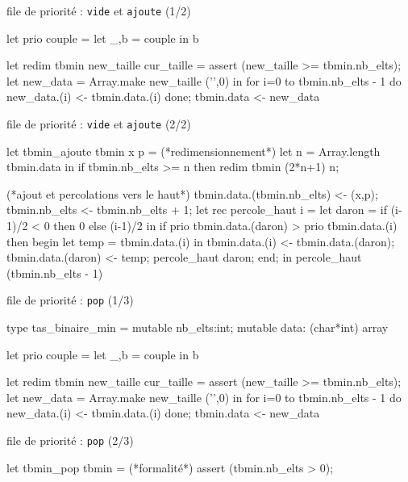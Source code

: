 \begin{adjustwidth}{-3cm}{-3cm}
\begin{implementation}{file de priorité : \texttt{vide} et \texttt{ajoute} (1/2) }
\begin{lstOCaml}
    let prio couple = 
        let _,b = couple in b

    let redim tbmin new_taille cur_taille = 
        assert (new_taille >= tbmin.nb_elts);
        let new_data = Array.make new_taille ('',0) in
        for i=0 to tbmin.nb_elts - 1 do
            new_data.(i) <- tbmin.data.(i)
        done;
        tbmin.data <- new_data
    \end{lstOCaml}
\end{implementation}

\begin{implementation}{file de priorité : \texttt{vide} et \texttt{ajoute} (2/2)}
    \begin{lstOCaml}
    let tbmin_ajoute tbmin x p  =
        (*redimensionnement*)
        let n = Array.length tbmin.data in
        if tbmin.nb_elts >= n then 
            redim tbmin (2*n+1) n;

        (*ajout et percolations vers le haut*)
        tbmin.data.(tbmin.nb_elts) <- (x,p);
        tbmin.nb_elts <- tbmin.nb_elts + 1;
        let rec percole_haut i =
            let daron = if (i-1)/2 < 0 then 0 else (i-1)/2 in
            if prio tbmin.data.(daron) > prio tbmin.data.(i) then begin
                let temp = tbmin.data.(i) in
                tbmin.data.(i) <- tbmin.data.(daron);
                tbmin.data.(daron) <- temp;
                percole_haut daron;
            end;
        in percole_haut (tbmin.nb_elts - 1)
    \end{lstOCaml}
\end{implementation}

\begin{implementation}{file de priorité : \texttt{pop} (1/3)}
    \begin{lstOCaml}
    type tas_binaire_min = {
        mutable nb_elts:int; 
        mutable data: (char*int) array
    }

    let prio couple = 
        let _,b = couple in b

    let redim tbmin new_taille cur_taille = 
        assert (new_taille >= tbmin.nb_elts);
        let new_data = Array.make new_taille ('',0) in
        for i=0 to tbmin.nb_elts - 1 do
            new_data.(i) <- tbmin.data.(i)
        done;
        tbmin.data <- new_data
    \end{lstOCaml}
\end{implementation}

\begin{implementation}{file de priorité : \texttt{pop} (2/3)}
    \begin{lstOCaml}
    let tbmin_pop tbmin =
        (*formalité*)
        assert (tbmin.nb_elts > 0); 
    

\end{lstOCaml}
\end{implementation}
\end{adjustwidth}
